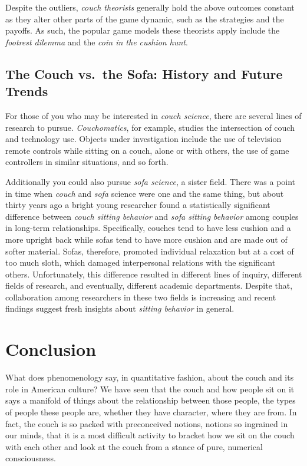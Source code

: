 \documentclass[12pt]{article}
\begin{document}
Despite the outliers, \emph{couch theorists} generally hold the
above outcomes constant as they alter other parts of the game
dynamic, such as the strategies and the payoffs.  As such, the
popular game models these theorists apply include the
\emph{footrest dilemma} and the \emph{coin in the cushion hunt}.

\subsection{The Couch vs.\ the Sofa: History and Future Trends}


For those of you who may be interested in \emph{couch science},
there are several lines of research to pursue.
\emph{Couchomatics}, for example, studies the intersection of
couch and technology use. Objects under investigation include the
use of television remote controls while sitting on a couch, alone
or with others, the use of game controllers in similar situations,
and so forth.

Additionally you could also pursue \emph{sofa science}, a sister
field. There was a point in time when \emph{couch} and \emph{sofa}
science were one and the same thing, but about thirty years ago a
bright young researcher found a statistically significant
difference between \emph{couch sitting behavior} and \emph{sofa
sitting behavior} among couples in long-term relationships.
Specifically, couches tend to have less cushion and a more upright
back while sofas tend to have more cushion and are made out of
softer material. Sofas, therefore, promoted individual relaxation
but at a cost of too much sloth, which damaged interpersonal
relations with the significant others. Unfortunately, this
difference resulted in different lines of inquiry, different
fields of research, and eventually, different academic
departments. Despite that, collaboration among researchers in
these two fields is increasing and recent findings suggest fresh
insights about \emph{sitting behavior} in general.

\section{Conclusion}


What does phenomenology say, in quantitative fashion, about the
couch and its role in American culture? We have seen that the
couch and how people sit on it says a manifold of things about the
relationship between those people, the types of people these
people are, whether they have character, where they are from. In
fact, the couch is so packed with preconceived notions, notions so
ingrained in our minds, that it is a most difficult activity to
bracket how we sit on the couch with each other and look at the
couch from a stance of pure, numerical consciousness.
\end{document}
